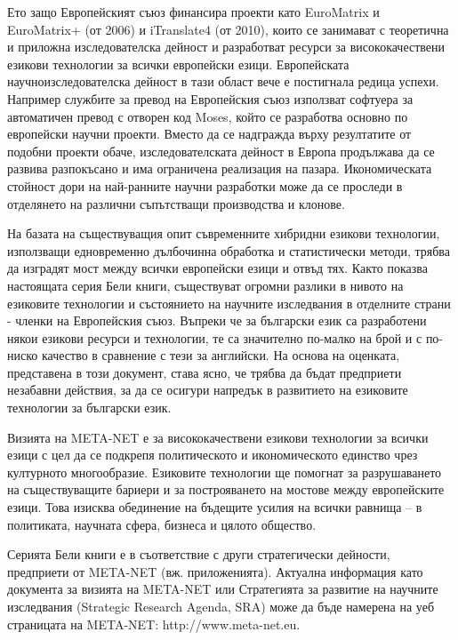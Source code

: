 \begin{multicols}{2}
  Ето защо Европейският съюз финансира проекти като EuroMatrix и EuroMatrix+ (от 2006) и iTranslate4 (от 2010), които се занимават с теоретична и приложна изследователска дейност и разработват ресурси за висококачествени езикови технологии за всички европейски езици. Европейската научноизследователска дейност в тази област вече е постигнала редица успехи. Например службите за превод на Европейския съюз използват софтуера за автоматичен превод с отворен код Moses, който се разработва основно по европейски научни проекти. Вместо да се надгражда върху резултатите от подобни проекти обаче, изследователската дейност в Европа  продължава да се развива разпокъсано и има ограничена реализация на пазара. Икономическата стойност дори на най-ранните научни разработки може да се проследи в отделянето на различни съпътстващи производства и клонове. %


  На базата на съществуващия опит съвременните хибридни езикови технологии, използващи едновременно дълбочинна обработка и статистически методи, трябва да изградят мост между всички европейски езици и отвъд тях. Както показва настоящата серия Бели книги, съществуват огромни разлики в нивото на езиковите технологии и състоянието на научните изследвания в отделните страни - членки на Европейския съюз.
  Въпреки че за български език са разработени някои езикови ресурси и технологии, те са значително по-малко на брой и с по-ниско качество в сравнение с тези за английски.
  На основа на оценката, представена в този документ, става ясно, че трябва да бъдат предприети незабавни действия, за да се осигури напредък в развитието на езиковите технологии за български език.

  Визията на META-NET е за висококачествени езикови технологии за всички езици с цел да се подкрепя политическото и икономическото единство чрез културното многообразие. Езиковите технологии ще помогнат за разрушаването на съществуващите бариери и за построяването на мостове между европейските езици. Това изисква обединение на бъдещите усилия на всички равнища – в политиката, научната сфера, бизнеса и цялото общество.

  Серията Бели книги е в съответствие с други стратегически дейности, предприети от META-NET (вж. приложенията). Актуална информация като документа за визията на META-NET \cite{Meta1} или Стратегията за развитие на научните изследвания (Strategic Research Agenda, SRA) може да бъде намерена на уеб страницата на META-NET: http://www.meta-net.eu.
  \end{multicols}

